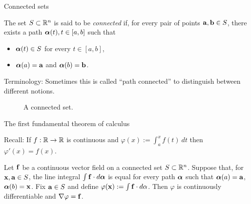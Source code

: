  {Connected sets}




\begin{definition}[connected]
    The set \(S\subset \bR^n\) is said to be \emph{connected} if, for every pair of points \(\aa,\bb\in S\), there exists a path \(\aalpha(t), t\in[a,b]\) such that
    \begin{itemize}
        \item \(\aalpha(t)\in S\) for every \( t\in[a,b]\),
        \item \(\aalpha(a)=\aa\) and \(\aalpha(b)=\bb\).
    \end{itemize}
\end{definition}

{Terminology:} Sometimes this is called ``path connected'' to distinguish between different notions.



\begin{figure}
    \caption{A connected set.}
\end{figure}







{The first fundamental theorem of calculus}

{Recall:}
If \(f:\bR \to \bR\) is continuous and \(\varphi(x) := \int_a^x f(t) \ dt\) then \(\varphi'(x) = f(x)\).

\begin{theorem}
    Let \(\ff\) be a continuous vector field on a connected set \(S \subset \bR^n\).
    Suppose that, for \(\xx,\aa\in S\), the line integral \(\int \ff \cdot d\aalpha\) is equal for every path \(\aalpha\) such that \(\aalpha(a)=\aa\), \(\aalpha(b)=\xx\).
    Fix \(\aa\in S\) and define \(\varphi(\xx):= \int \ff \cdot d\alpha\).
    Then \(\varphi\) is continuously differentiable and \(\nabla \varphi = \ff\).
\end{theorem}

